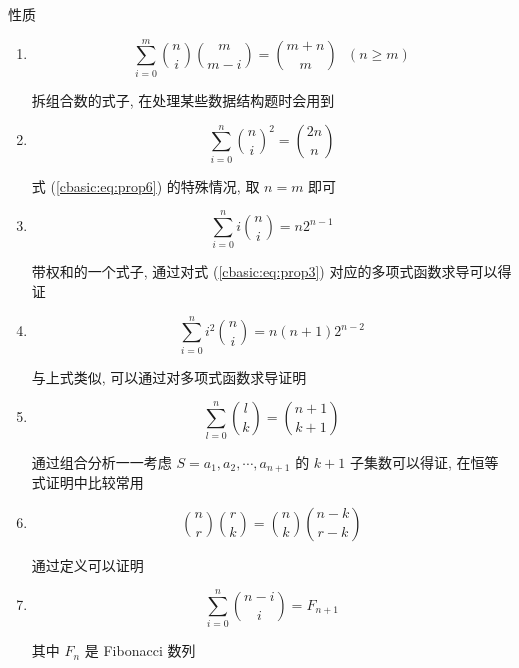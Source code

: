 \begin{frame}[allowframebreaks]{性质}
\begin{enumerate}
		\item \begin{equation}
			      \label{cbasic:eq:prop6}
			      \sum_{i=0}^m \binom{n}{i}\binom{m}{m-i} = \binom{m+n}{m}\ \ \ (n \geq m)
		      \end{equation}

		      拆组合数的式子, 在处理某些数据结构题时会用到

		\item \begin{equation}
			      \label{cbasic:eq:prop7}
			      \sum_{i=0}^n\binom{n}{i}^2=\binom{2n}{n}
		      \end{equation}

		      式 (\ref{cbasic:eq:prop6}) 的特殊情况, 取 $n=m$ 即可

		\item \begin{equation}
			      \label{cbasic:eq:prop8}
			      \sum_{i=0}^ni\binom{n}{i}=n2^{n-1}
		      \end{equation}

		      带权和的一个式子, 通过对式 (\ref{cbasic:eq:prop3}) 对应的多项式函数求导可以得证

		\item \begin{equation}
			      \label{cbasic:eq:prop9}
			      \sum_{i=0}^ni^2\binom{n}{i}=n(n+1)2^{n-2}
		      \end{equation}

		      与上式类似, 可以通过对多项式函数求导证明

		\item \begin{equation}
			      \label{cbasic:eq:prop10}
			      \sum_{l=0}^n\binom{l}{k} = \binom{n+1}{k+1}
		      \end{equation}

		      通过组合分析一一考虑 $S={a_1, a_2, \cdots, a_{n+1}}$ 的 $k+1$ 子集数可以得证, 在恒等式证明中比较常用

		\item \begin{equation}
			      \label{cbasic:eq:prop11}
			      \binom{n}{r}\binom{r}{k} = \binom{n}{k}\binom{n-k}{r-k}
		      \end{equation}

		      通过定义可以证明

		\item \begin{equation}
			      \label{cbasic:eq:prop12}
			      \sum_{i=0}^n\binom{n-i}{i}=F_{n+1}
		      \end{equation}

		      其中 $F_n$ 是 Fibonacci 数列
	\end{enumerate}
\end{frame}

